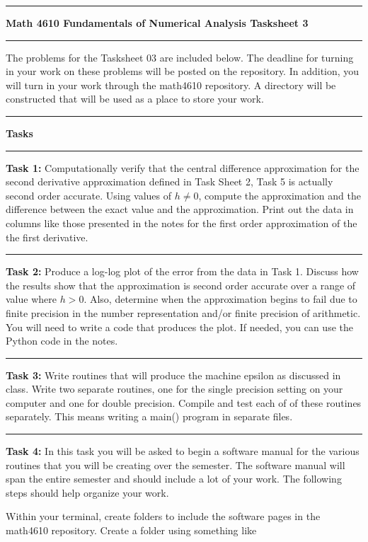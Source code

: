 \documentclass[10pt,fleqn]{article}
\begin{document}
\vskip0.1in\hrule\vskip0.1in \noindent
{\bf{\Large Math 4610 Fundamentals of Numerical Analysis Tasksheet 3}}
\vskip0.1in\hrule\vskip0.1in \noindent
The problems for the Tasksheet 03 are included below. The deadline for turning
in your work on these problems will be posted on the repository. In addition,
you will turn in your work through the math4610 repository. A directory will be
constructed that will be used as a place to store your work.
\vskip0.1in\hrule\vskip0.1in \noindent
{\bf{\large Tasks}}
\vskip0.1in\hrule\vskip0.1in \noindent
\begin{trivlist}
  \item[\bf Task 1:] Computationally verify that the central difference
        approximation for the second derivative approximation defined in Task
        Sheet 2, Task 5 is actually second order accurate. Using values of
        \(h\neq 0\), compute the approximation and the difference between the
        exact value and the approximation. Print out the data in columns like
        those presented in the notes for the first order approximation of the
        the first derivative.
\vskip0.1in\hrule\vskip0.1in \noindent
  \item[\bf Task 2:] Produce a log-log plot of the error from the data in Task
        1. Discuss how the results show that the approximation is second order
        accurate over a range of value where \(h>0\). Also, determine when the
        approximation begins to fail due to finite precision in the number
        representation and/or finite precision of arithmetic. You will need to
        write a code that produces the plot. If needed, you can use the Python
        code in the notes. 
\vskip0.1in\hrule\vskip0.1in \noindent
  \item[\bf Task 3:] Write routines that will produce the machine epsilon as
        discussed in class. Write two separate routines, one for the single
        precision setting on your computer and one for double precision. Compile
        and test each of of these routines separately. This means writing a
        main() program in separate files. 
\vskip0.1in\hrule\vskip0.1in \noindent
  \item[\bf Task 4:] In this task you will be asked to begin a software manual
        for the various routines that you will be creating over the semester.
        The software manual will span the entire semester and should include a
        lot of your work. The following steps should help organize your work.
        \begin{trivlist}
           \item Within your terminal, create folders to include the software
                 pages in the math4610 repository. Create a folder using
                 something like
                 \begin{verbatim}


\end{verbatim}
\end{trivlist}
\end{trivlist}
\end{document}
